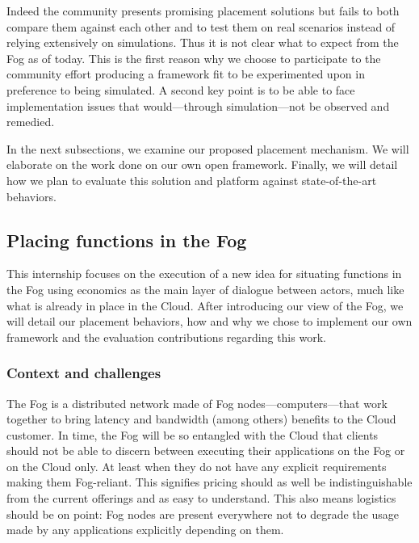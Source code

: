 \documentclass[11pt]{sdm}
\begin{document}
Indeed the community presents promising placement solutions but fails to both compare them against each other and to test them on real scenarios instead of relying extensively on simulations. Thus it is not clear what to expect from the Fog as of today. This is the first reason why we choose to participate to the community effort producing a framework fit to be experimented upon in preference to being simulated. A second key point is to be able to face implementation issues that would—through simulation—not be observed and remedied.

In the next subsections, we examine our proposed placement mechanism. We will elaborate on the work done on our own open framework. Finally, we will detail how we plan to evaluate this solution and platform against state-of-the-art behaviors.


\subsection{Placing functions in the Fog}

This internship focuses on the execution of a new idea for situating functions in the Fog using economics as the main layer of dialogue between actors, much like what is already in place in the Cloud. After introducing our view of the Fog, we will detail our placement behaviors, how and why we chose to implement our own framework and the evaluation contributions regarding this work.

\subsubsection{Context and challenges}

The Fog is a distributed network made of Fog nodes—computers—that work together to bring latency and bandwidth (among others) benefits to the Cloud customer. In time, the Fog will be so entangled with the Cloud that clients should not be able to discern between executing their applications on the Fog or on the Cloud only. At least when they do not have any explicit requirements making them Fog-reliant. This signifies pricing should as well be indistinguishable from the current offerings and as easy to understand. This also means logistics should be on point: Fog nodes are present everywhere not to degrade the usage made by any applications explicitly depending on them.
\end{document}
